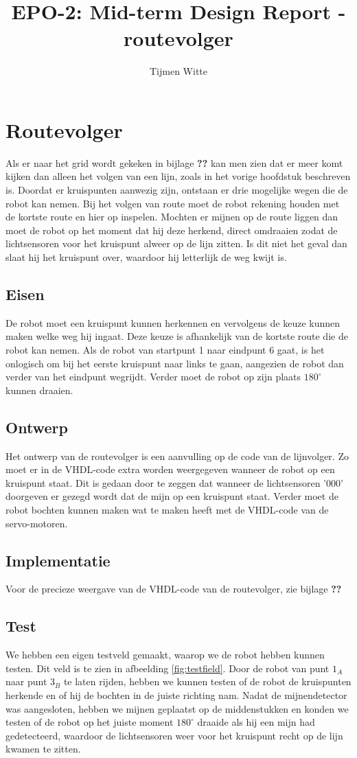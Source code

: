 \documentclass{report}
\title{EPO-2: Mid-term Design Report - routevolger}
\author{Tijmen Witte}
\begin{document}
\chapter{Routevolger}
\label{ch:probleem}

Als er naar het grid wordt gekeken in bijlage \textbf{??} kan men zien dat er meer komt kijken dan alleen het volgen van een lijn, zoals in het vorige hoofdstuk beschreven is. Doordat er kruispunten aanwezig zijn, ontstaan er drie mogelijke wegen die de robot kan nemen. Bij het volgen van route moet de robot rekening houden met de kortste route en hier op inspelen. Mochten er mijnen op de route liggen dan moet de robot op het moment dat hij deze herkend, direct omdraaien zodat de lichtsensoren voor het kruispunt alweer op de lijn zitten. Is dit niet het geval dan slaat hij het kruispunt over, waardoor hij letterlijk de weg kwijt is.

\section{Eisen}
De robot moet een kruispunt kunnen herkennen en vervolgens de keuze kunnen maken welke weg hij ingaat. Deze keuze is afhankelijk van de kortste route die de robot kan nemen. Als de robot van startpunt 1 naar eindpunt 6 gaat, is het onlogisch om bij het eerste kruispunt naar links te gaan, aangezien de robot dan verder van het eindpunt wegrijdt. Verder moet de robot op zijn plaats $180^\circ$ kunnen draaien.

\section{Ontwerp}
Het ontwerp van de routevolger is een aanvulling op de code van de lijnvolger. Zo moet er in de VHDL-code extra worden weergegeven wanneer de robot op een kruispunt staat. Dit is gedaan door te zeggen dat wanneer de lichtsensoren '000' doorgeven er gezegd wordt dat de mijn op een kruispunt staat. Verder moet de robot bochten kunnen maken wat te maken heeft met de VHDL-code van de servo-motoren.

\section{Implementatie}
Voor de precieze weergave van de VHDL-code van de routevolger, zie bijlage\textbf{ ??}

\section{Test}
We hebben een eigen testveld gemaakt, waarop we de robot hebben kunnen testen. Dit veld is te zien in afbeelding \ref{fig:testfield}. Door de robot van punt $1_A$ naar punt $3_B$ te laten rijden, hebben we kunnen testen of de robot de kruispunten herkende en of hij de bochten in de juiste richting nam. Nadat de mijnendetector was aangesloten, hebben we mijnen geplaatst op de middenstukken en konden we testen of de robot op het juiste moment $180^\circ$ draaide als hij een mijn had gedetecteerd, waardoor de lichtsensoren weer voor het kruispunt  recht op de lijn kwamen te zitten.
\end{document}

